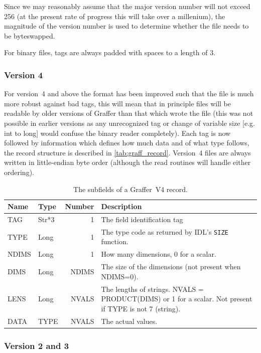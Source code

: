\documentclass[english]{article}
\begin{document}
Since we may reasonably assume that the major version number will not
exceed 256 (at the present rate of progress this will take over a
millenium), the magnitude of the version number is used to determine
whether the file needs to be byteswapped.

For binary files, tags are always padded with spaces to a length
of 3. 

\subsubsection{Version 4}
\label{sec:bin_v4}

For version~4 and above the format has been improved such that the file
is much more robust against bad tags, this will mean that in principle
files will be readable by older versions of Graffer than that which
wrote the file (this was not possible in earlier versions as any
unrecognized tag or change of variable size [e.g. int to long] would
confuse the binary reader completely). Each tag is
now followed by information which defines how much data and of what
type follows, the record structure is described in
\autoref{tab:graff_record}. Version~4 files are always written in
little-endian byte order (although the read routines will handle either
ordering).

\begin{table}
  \centering
  \begin{tabular}{llrp{}}
    \hline
    Name & Type & Number & Description \\
    \hline
    TAG & Str*3 & 1 & The field identification tag \\
    TYPE & Long & 1 & The type code as returned by IDL's \texttt{SIZE}
    function.\\
    NDIMS & Long & 1 & How many dimensions, 0 for a scalar.\\
    DIMS & Long & NDIMS & The size of the dimensions (not present when
    NDIMS=0).\\
    LENS & Long & NVALS & The lengths of strings. NVALS = PRODUCT(DIMS)
    or 1 for a scalar. Not present if TYPE is not 7 (string).\\
    DATA & TYPE & NVALS & The actual values.\\
    \hline
  \end{tabular}
  \caption{The subfields of a Graffer~V4 record.}
  \label{tab:graff_record}
\end{table}

\subsubsection{Version 2 and 3}
\label{sec:bin_v23}
\end{document}
